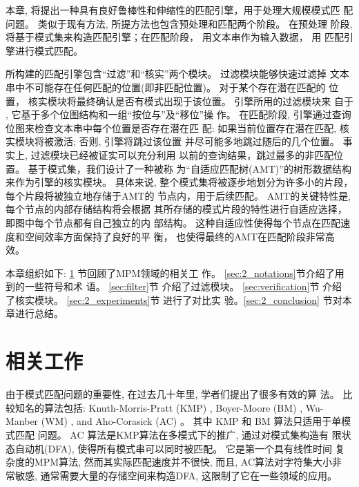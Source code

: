 本章, 将提出一种具有良好鲁棒性和伸缩性的匹配引擎，用于处理大规模模式匹
配问题。 类似于现有方法, 所提方法也包含预处理和匹配两个阶段。 在预处理
阶段,将基于模式集来构造匹配引擎；在匹配阶段， 用文本串作为输入数据， 用
匹配引擎进行模式匹配。


所构建的匹配引擎包含“过滤”和“核实”两个模块。 过滤模块能够快速过滤掉
文本串中不可能存在任何匹配的位置(即非匹配位置)。 对于某个存在潜在匹配的
位置， 核实模块将最终确认是否有模式出现于该位置。 引擎所用的过滤模块来
自于 \cite{Lee2013}, 它基于多个位图结构和一组“按位与”及“移位”操
作。 在匹配阶段, 引擎通过查询位图来检查文本串中每个位置是否存在潜在匹
配: 如果当前位置存在潜在匹配, 核实模块将被激活; 否则, 引擎将跳过该位置
并尽可能多地跳过随后的几个位置。 事实上, 过滤模块已经被证实可以充分利用
以前的查询结果，跳过最多的非匹配位置。 基于模式集，我们设计了一种被称
为“自适应匹配树(AMT)”的树形数据结构来作为引擎的核实模块。 具体来说,
整个模式集将被逐步地划分为许多小的片段， 每个片段将被独立地存储于AMT的
节点内，用于后续匹配。 AMT的关键特性是, 每个节点的内部存储结构将会根据
其所存储的模式片段的特性进行自适应选择，即图中每个节点都有自己独立的内
部结构。 这种自适应性使得每个节点在匹配速度和空间效率方面保持了良好的平
衡， 也使得最终的AMT在匹配阶段非常高效。

本章组织如下: \ref{sec:2_RW} 节回顾了MPM领域的相关工
作。  \ref{sec:2_notations}节介绍了用到的一些符号和术
语。 \ref{sec:filter}节 介绍了过滤模块。 \ref{sec:verification}节 介绍
了核实模块。 \ref{sec:2_experiments}节 进行了对比实
验。\ref{sec:2_conclusion} 节对本章进行总结。

\section{相关工作}
\label{sec:2_RW}

由于模式匹配问题的重要性, 在过去几十年里, 学者们提出了很多有效的算
法。 比较知名的算法包括: Knuth-Morris-Pratt (\textsf{KMP})
\cite{Knuth1977}, Boyer-Moore (\textsf{BM}) \cite{Boyer1977},
Wu-Manber (\textsf{WM}) \cite{Wu1994}, and Aho-Corasick (\textsf{AC})
\cite{Aho1975}。 其中 \textsf{KMP} 和 \textsf{BM} 算法只适用于单模式匹配
问题。  \textsf{AC} 算法是KMP算法在多模式下的推广, 通过对模式集构造有
限状态自动机(DFA), 使得所有模式串可以同时被匹配。 它是第一个具有线性时间
复杂度的MPM算法, 然而其实际匹配速度并不很快, 而且, AC算法对字符集大小非
常敏感, 通常需要大量的存储空间来构造DFA, 这限制了它在一些领域的应用。

